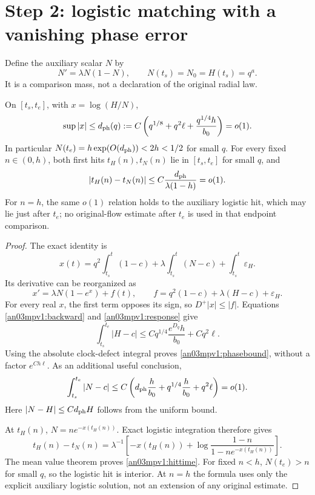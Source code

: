 \documentclass[11pt]{article}
\numberwithin{equation}{section}
\theoremstyle{remark}\newtheorem{remark}[theorem]{Remark}
\newcommand{\eps}{\varepsilon}\newcommand{\one}{\mathbf1}
\begin{document}
\section{Step 2: logistic matching with a vanishing phase error}
Define the auxiliary scalar $N$ by
\begin{equation}
 N'=\lambda N(1-N),\qquad N(t_s)=N_0=H(t_s)=q^a.
 \label{an03mpv1:logistic}
\end{equation}
It is a comparison mass, not a declaration of the original radial law.

\begin{proposition}
\label{an03mpv1:phase}
On $[t_s,t_e]$, with $x=\log(H/N)$,
\begin{equation}
 \sup|x|\le d_{\rm ph}(q):=
 C\left(q^{1/8}+q^2\ell+\frac{q^{1/4}h}{b_0}\right)=o(1).
 \label{an03mpv1:phasebound}
\end{equation}
In particular $N(t_e)=h\exp(O(d_{\rm ph}))<2h<1/2$ for small $q$.
For every fixed $n\in(0,h)$, both first hits $t_H(n),t_N(n)$ lie
in $[t_s,t_e]$ for small $q$, and
\begin{equation}
 |t_H(n)-t_N(n)|\le C\frac{d_{\rm ph}}{\lambda(1-h)}=o(1).
 \label{an03mpv1:hittime}
\end{equation}
For $n=h$, the same $o(1)$ relation holds to the auxiliary logistic
hit, which may lie just after $t_e$; no original-flow estimate after
$t_e$ is used in that endpoint comparison.
\end{proposition}
\begin{proof}
The exact identity is
\[
 x(t)=q^2\int_{t_s}^t(1-c)+\lambda\int_{t_s}^t(N-c)
                   +\int_{t_s}^t\eps_H.
\]
Its derivative can be reorganized as
\begin{equation}
 x'=\lambda N(1-e^x)+f(t),\qquad
 f=q^2(1-c)+\lambda(H-c)+\eps_H.
 \label{an03mpv1:contractphase}
\end{equation}
For every real $x$, the first term opposes its sign, so
$D^+|x|\le|f|$. Equations \eqref{an03mpv1:backward} and
\eqref{an03mpv1:response} give
\[
 \int_{t_s}^{t_e}|H-c|\le Cq^{1/4}\frac{e^{D_q}h}{b_0}
                                  +Cq^2\ell.
\]
Using the absolute clock-defect integral proves
\eqref{an03mpv1:phasebound}, without a factor $e^{Ch\ell}$.
As an additional useful conclusion,
\begin{equation}
 \int_{t_s}^{t_e}|N-c|
 \le C\left(d_{\rm ph}\frac{h}{b_0}
              +q^{1/4}\frac{h}{b_0}+q^2\ell\right)=o(1).
 \label{an03mpv1:phaseintegral}
\end{equation}
Here $|N-H|\le C d_{\rm ph}H$ follows from the uniform bound.

At $t_H(n)$, $N=n e^{-x(t_H(n))}$. Exact logistic integration
therefore gives
\[
 t_H(n)-t_N(n)=\lambda^{-1}
 \left[-x(t_H(n))+
 \log\frac{1-n}{1-n e^{-x(t_H(n))}}\right].
\]
The mean value theorem proves \eqref{an03mpv1:hittime}. For fixed
$n<h$, $N(t_e)>n$ for small $q$, so the logistic hit is interior.
At $n=h$ the formula uses only the explicit auxiliary logistic
solution, not an extension of any original estimate.
\end{proof}
\end{document}

